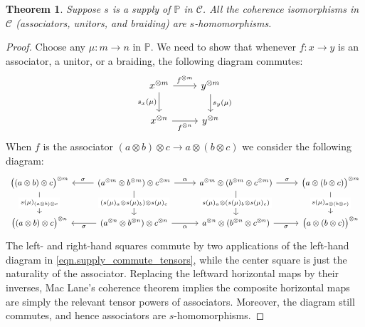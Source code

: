 \documentclass[11pt, oneside, article]{memoir}
\theoremstyle{plain}
\newtheorem{theorem}{Theorem}[chapter]
\theoremstyle{definition}
\theoremstyle{remark}
\newcommand{\cat}[1]{\mathcal{#1}}%
\newcommand{\tpow}[1]{^{\otimes #1}}
\newcommand{\pp}{\mathbb{P}}
\begin{document}
\begin{theorem}\label{thm.coherence_isos_homos}
Suppose $s$ is a supply of $\pp$ in $\cat{C}$. All the coherence isomorphisms in $\cat{C}$ (associators, unitors, and braiding) are $s$-homomorphisms.
\end{theorem}
\begin{proof}
Choose any $\mu\colon m\to n$ in $\pp$. We need to show that whenever $f\colon x\to y$ is an associator, a unitor, or a braiding, the following diagram commutes:
\[
 \begin{tikzcd}
	x\tpow{m}\ar[d, "s_x(\mu)"']\ar[r, "f\tpow{m}"]&
	y\tpow{m}\ar[d, "s_y(\mu)"]\\
	x\tpow{n}\ar[r, "f\tpow{n}"']&
	y\tpow{n}
\end{tikzcd}
\]
When $f$ is the associator $(a\otimes b)\otimes c\to a\otimes (b\otimes c)$ we consider the following diagram:
\[
\begin{tikzcd}[row sep=24pt, font=\small]
  \big((a\otimes b)\otimes c\big)\tpow{m}\ar[d, "s(\mu)_{(a\otimes b)\otimes c}" description]&
  (a\tpow{m}\otimes b\tpow{m})\otimes c\tpow{m}\ar[l, "\sigma"']\ar[r, "\alpha"]\ar[d, "(s(\mu)_a\otimes s(\mu)_b)\otimes s(\mu)_c" description]&
  a\tpow{m}\otimes (b\tpow{m}\otimes c\tpow{m})\ar[r, "\sigma"]\ar[d, "s(\mu)_a\otimes (s(\mu)_b\otimes s(\mu)_c)" description]&
  \big(a\otimes (b\otimes c)\big)\tpow{m}\ar[d, "s(\mu)_{a\otimes (b\otimes c)}" description]
  \\
  \big((a\otimes b)\otimes c\big)\tpow{n}&
  (a\tpow{n}\otimes b\tpow{n})\otimes c\tpow{n}\ar[l, "\sigma"]\ar[r, "\alpha"']&
  a\tpow{n}\otimes (b\tpow{n}\otimes c\tpow{n})\ar[r, "\sigma"']&
  \big(a\otimes (b\otimes c)\big)\tpow{n}
\end{tikzcd}
\]
The left- and right-hand squares commute by two applications of the left-hand diagram in \cref{eqn.supply_commute_tensors}, while the center square is just the naturality of the associator. Replacing the leftward horizontal maps by their inverses, Mac Lane's coherence theorem implies the composite horizontal maps are simply the relevant tensor powers of associators. Moreover, the diagram still commutes, and hence associators are $s$-homomorphisms.


\end{proof}
\end{document}
